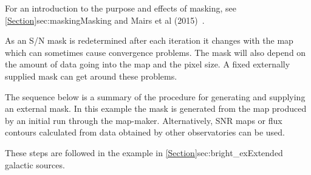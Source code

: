For an introduction to the purpose and effects of masking, see
\cref{Section}{sec:masking}{Masking} and Mairs et al (2015)~\cite{extendedrecovery}.

As an S/N mask is redetermined after each iteration it changes with the map
 which can sometimes cause convergence problems. The mask
will also depend on the amount of data going into the map and the
pixel size. A fixed externally supplied mask  can get around these problems.

The sequence below is a summary of the procedure for generating and
supplying an external mask. In this example the mask is generated from
the map produced by an initial run through the map-maker.
Alternatively, SNR maps or flux contours calculated from
data obtained by other observatories can be used.

These steps are followed in the example in
\cref{Section}{sec:bright_ex}{Extended galactic sources}.

